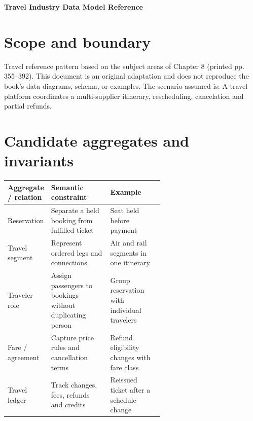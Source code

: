 \documentclass[11pt,letterpaper]{article}
\begin{document}
\begin{center}
{\LARGE\bfseries\color{navy} Travel Industry Data Model Reference}\par
\vspace{0.25em}{\large Conceptual to logical reference | original adaptation}\par
{}
\end{center}
\vspace{0.8em}
\section{Scope and boundary}
Travel reference pattern based on the subject areas of Chapter 8 (printed pp. 355--392). This document is an original adaptation and does not reproduce the book's data diagrams, schema, or examples. The scenario assumed is: A travel platform coordinates a multi-supplier itinerary, rescheduling, cancelation and partial refunds.


\section{Candidate aggregates and invariants}
\begin{tabularx}{\linewidth}{@{}>{\raggedright\arraybackslash}p{0.23\linewidth} >{\raggedright\arraybackslash}p{0.38\linewidth}>{\raggedright\arraybackslash}X@{}}
\toprule
\textbf{Aggregate / relation} & \textbf{Semantic constraint} & \textbf{Example} \\ 
\midrule
Reservation & Separate a held booking from fulfilled ticket & Seat held before payment \\ 
Travel segment & Represent ordered legs and connections & Air and rail segments in one itinerary \\ 
Traveler role & Assign passengers to bookings without duplicating person & Group reservation with individual travelers \\ 
Fare / agreement & Capture price rules and cancellation terms & Refund eligibility changes with fare class \\ 
Travel ledger & Track changes, fees, refunds and credits & Reissued ticket after a schedule change \\ 
\bottomrule
\end{tabularx}
\end{document}
